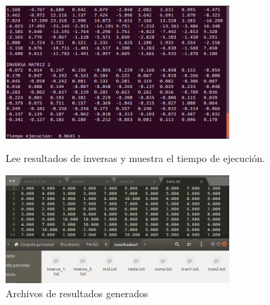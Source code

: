 \documentclass[12pt]{article}
\begin{document}
\begin{itemize}
\begin{itemize}
\begin{figure}[h!]
                            \end{figure}
                            \newpage
                            \begin{figure}[h!]
                                \centering
                                
                                \includegraphics[width=0.75\textwidth]{Practica4/Images/Linux/5_5.png}
                                \caption{Lee resultados de inversas y muestra el tiempo de ejecución.}
                                 \includegraphics[width=0.75\textwidth]{Practica4/Images/Linux/5_6.png}
                                \caption{Archivos de resultados generados}
                            \end{figure}



\end{itemize}
\end{itemize}
\end{document}
